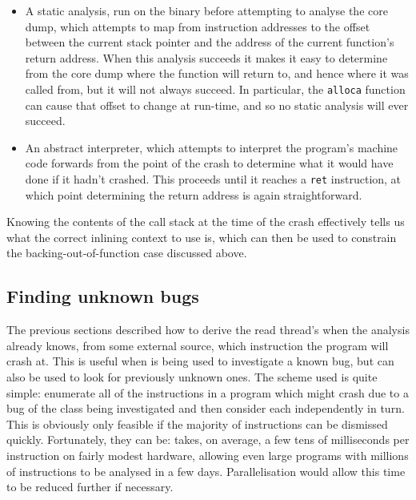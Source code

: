 \begin{itemize}
\item
  A static analysis, run on the binary before attempting to analyse
  the core dump, which attempts to map from instruction addresses to
  the offset between the current stack pointer and the address of the
  current function's return address.  When this analysis succeeds it
  makes it easy to determine from the core dump where the function
  will return to, and hence where it was called from, but it will not
  always succeed.  In particular, the \verb|alloca| function can cause
  that offset to change at run-time, and so no static analysis will
  ever succeed.
\item
  An abstract interpreter, which attempts to interpret the program's
  machine code forwards from the point of the crash to determine what
  it would have done if it hadn't crashed.  This proceeds until it
  reaches a \verb|ret| instruction, at which point determining the
  return address is again straightforward.
\end{itemize}


Knowing the contents of the call stack at the time of the crash
effectively tells us what the correct inlining context to use is,
which can then be used to constrain the backing-out-of-function case
discussed above.

\subsection{Finding unknown bugs}
\label{sect:derive:unknown_bugs}


The previous sections described how to derive the read thread's
{\StateMachine} when the analysis already knows, from some external
source, which instruction the program will crash at.  This is useful
when {\technique} is being used to investigate a known bug, but
{\technique} can also be used to look for previously unknown ones.
The scheme used is quite simple: enumerate all of the instructions in
a program which might crash due to a bug of the class being
investigated and then consider each independently in turn.  This is
obviously only feasible if the majority of instructions can be
dismissed quickly.  Fortunately, they can be: {\implementation} takes,
on average, a few tens of milliseconds per instruction on fairly
modest hardware, allowing even large programs with millions of
instructions to be analysed in a few days.  Parallelisation would allow this time to be
reduced further if necessary.

